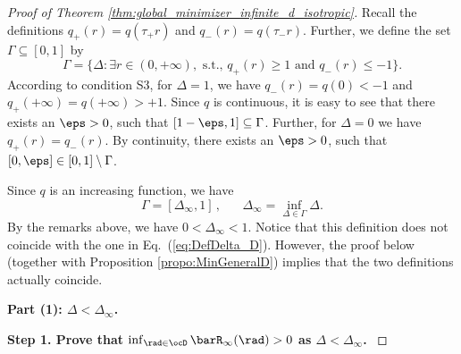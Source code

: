 \documentclass[11pt]{article}
\begin{document}
\begin{proof}[Proof of Theorem \ref{thm:global_minimizer_infinite_d_isotropic}]
Recall the definitions $q_+(r) = q(\tau_+ r)$ and $q_-(r) = q(\tau_- r)$. Further, we define the set $\Gamma\subseteq [0,1]$ by
\begin{equation}\label{eqn:Gamma_set_in_isotropic_proof}
\Gamma = \{ \Delta: \exists r \in (0, +\infty), \text{ s.t., } q_+( r) \ge 1 \text{ and } q_-( r ) \le -1 \}.
\end{equation}
According to condition {\sf S3}, for $\Delta = 1$, we have $q_-(r) = q(0) < -1$ and $q_+(+\infty) = q(+\infty) > +1$. 
Since $q$ is continuous, it is easy to see that there exists an $\eps > 0$, such that $[1 - \eps,1] \subseteq  \Gamma$. 
Further, for $\Delta = 0$ we have $q_+(r) = q_-(r)$. By continuity, there exists an $\eps > 0$, such that $[0,\eps] \in [0,1]\setminus \Gamma$.  

Since $q$ is an increasing function, we have
%
\begin{equation}\label{eqn:Delta_infty_in_isotropic_proof}
\Gamma = [\Delta_{\infty},1]\,,\;\;\;\;\;\; \Delta_\infty = \inf_{\Delta \in \Gamma} \Delta. 
\end{equation}
%
By the remarks above, we have $0 < \Delta_\infty < 1$. Notice that this definition does not coincide with the one in Eq.~(\ref{eq:DefDelta_D}).
However, the proof below (together with Proposition \ref{propo:MinGeneralD}) implies that the two definitions actually coincide.

\noindent
{\bf Part (1): $\Delta < \Delta_\infty$. } 

\noindent
{\bf Step 1. Prove that $\inf_{\rad \in \ocD} \barR_\infty(\rad) > 0$ as $\Delta < \Delta_\infty$. }



\end{proof}
\end{document}
